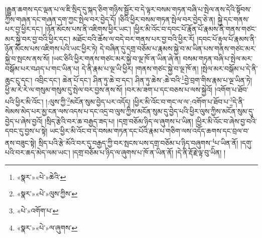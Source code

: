 །རྒྱུན་ཆགས་དང་ལྡན་པ་ལ་ཇི་སྲིད་དུ་སྐད་ཅིག་གཉིས་སྦྱོར་བ་དེ་ལྟར་བསམ་གཏན་བཞི་པ་སྤེལ་ནས་དེའི་སྟོབས་ཀྱིས་གཞན་དང་གཞན་དག་ཀྱང་སྤེལ་བར་བྱེད་དོ། །ཅིའི་ཕྱིར་བསམ་གཏན་སྤེལ་བར་བྱེད་ཅེ་ན། སྐྱེ་དང་གནས་པར་བྱ་ཕྱིར་དང་། །ཉོན་མོངས་པས་ནི་འཇིགས་ཕྱིར་ཡང་། །ཕྱིར་མི་འོང་བ་དབང་པོ་རྣོན་པོ་རྣམས་ནི་གནས་གཙང་མར་སྐྱེ་བར་བྱ་བའི་ཕྱིར་དང་། མཐོང་བའི་ཆོས་ལ་བདེ་བར་གནས་པར་བྱ་བའི་ཕྱིར་རོ། །དབང་པོ་རྟུལ་པོ་རྣམས་ནི་ཉོན་མོངས་པས་འཇིགས་པའི་ཡང་ཕྱིར་ཏེ། དེ་བཞིན་དུ་དགྲ་བཅོམ་པ་རྣམས་སྐྱེ་བ་མ་ཡིན་པས་གནས་གཙང་མར་སྐྱེ་བ་སྤངས་ནས་སོ། །ཡང་ཅིའི་ཕྱིར་གནས་གཙང་མར་སྐྱེ་བ་ལྔ་ཁོ་ན་ཡིན་ཞེ་ན། བསམ་གཏན་བཞི་པ་སྤེལ་མར་བསྒོམ་པར་བཤད་པ་གང་ཡིན་པ། དེ་ནི་རྣམ་པ་ལྔ་ཡི་ཕྱིར། །གནས་གཙང་སྐྱེ་བ་ལྔ་ཁོ་ན། །སྤེལ་མར་བསྒོམ་པ་དེ་ནི་ཆུང་ངུ་དང་། འབྲིང་དང་། ཆེན་པོ་དང་། ཤིན་ཏུ་ཆེ་བ་དང་། ཤིན་ཏུ་ཆེས་:ཆེ་བའི་\footnote{«སྣར་»«པེ་»ཆེའི་}བྱེ་བྲག་གིས་རྣམ་པ་ལྔ་ཡིན་ཏེ། ཕྱི་མ་རེ་རེ་ལ་གསུམ་གསུམ་དུ་སྤེལ་བར་བྱས་ནས་སོ། །བར་མ་ཟག་པ་དང་བཅས་པ་ལས་སྐྱེའོ། །འགོག་པ་ཐོབ་པའི་ཕྱིར་མི་འོང་། །:ལུས་ཀྱི་\footnote{«སྣར་»«པེ་»ལུས་ཀྱིས་}མངོན་སུམ་བྱེད་པར་འདོད། །ཕྱིར་མི་འོང་བ་གང་ལ་ལ་:འགོག་པ་ཐོབ་པ་\footnote{«པེ་»འགོག་པ་}དེ་ནི་སེམས་མེད་པར་མྱ་ངན་ལས་འདས་པ་དང་འདྲ་བ་ལུས་ཀྱིས་མངོན་སུམ་དུ་བྱེད་པའི་ཕྱིར་ལུས་ཀྱིས་མངོན་སུམ་དུ་བྱེད་པ་ཞེས་བྱའོ། །སྲིད་རྩེའི་བར་ཆ་བརྒྱད་ཟད་པ། །དགྲ་བཅོམ་ཉིད་ལ་ཞུགས་པ་ཡིན། །ཕྱིར་མི་འོང་བ་ཞེས་བྱ་བའི་དབང་དུ་བྱས་པ་སྟེ། ཡང་ཕྱིར་མི་འོང་བ་དེ་བསམ་གཏན་དང་པོའི་རྣམ་པ་གཅིག་ལས་འདོད་ཆགས་དང་བྲལ་བ་ནས་བཟུང་སྟེ། སྲིད་པའི་རྩེ་མོའི་བར་དུ་བརྒྱད་ཀྱི་བར་སྤངས་པས་དགྲ་བཅོམ་པ་ཉིད་བཞུགས་\footnote{«སྣར་»«པེ་»ལ་ཞུགས་}པ་ཡིན་ནོ། །དགུ་པའི་བར་ཆད་མེད་ལམ་ཡང་། །དགྲ་བཅོམ་པ་ཉིད་ལ་ཞུགས་པ་ཁོ་ན་ཡིན་ནོ། །དེ་ནི་རྡོ་རྗེ་ལྟ་བུ་ཡིན། །
